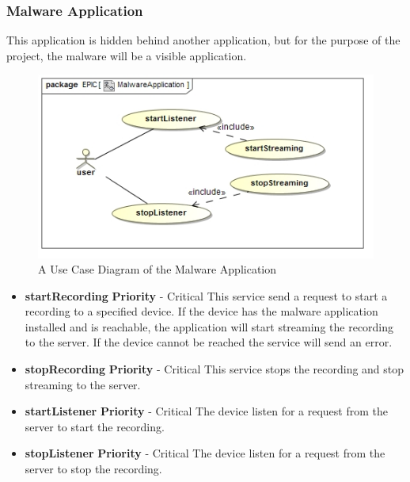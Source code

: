 \documentclass{article}
\begin{document}
\subsubsection{Malware Application}
	This application is hidden behind another application, but for the purpose of the project, the malware will be a visible application.
		\begin{figure}[H]
 			 \centering
			  \includegraphics[width=12cm]{MalwareApplicationUseCase}
		 	 \caption{A Use Case Diagram of the Malware Application}
		\end{figure}
		\begin{itemize}
			\item \textbf{startRecording}
				\newline\textbf{ Priority } - Critical
				\newline This service send a request to start a recording to a specified device. If the device has the malware application installed and is reachable, the application will start streaming the recording to the server. If the device cannot be reached the service will send an error.
			\item \textbf{stopRecording}
				\newline\textbf{ Priority } - Critical
				\newline This service stops the recording and stop streaming to the server.
			\item \textbf{startListener}
				\newline\textbf{ Priority } - Critical
				\newline The device listen for a request from the server to start the recording.
			\item \textbf{stopListener}
				\newline\textbf{ Priority } - Critical
				\newline The device listen for a request from the server to stop the recording.
		\end{itemize}
\end{document}
